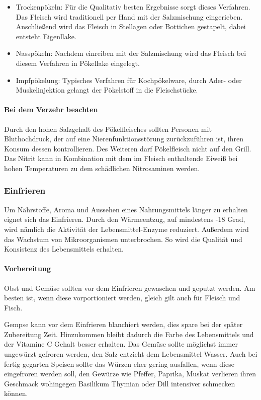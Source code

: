 \begin{itemize}
  \item Trockenpökeln: Für die Qualitativ besten Ergebnisse sorgt dieses Verfahren. Das Fleisch wird traditionell per Hand mit der Salzmischung eingerieben. Anschließend wird das Fleisch in Stellagen oder Bottichen gestapelt, dabei entsteht Eigenllake.
  \item Nasspökeln: Nachdem einreiben mit der Salzmischung wird das Fleisch bei diesem Verfahren in Pökellake eingelegt.
  \item   Impfpökelung: Typisches Verfahren für Kochpökelware, durch Ader- oder Muskelinjektion gelangt der Pökelstoff in die Fleischstücke.
 
\end{itemize}


\paragraph{Bei dem Verzehr beachten}
Durch den hohen Salzgehalt des Pökelfleisches sollten Personen mit Bluthochdruck, der auf eine Nierenfunktionsstörung zurückzuführen ist, ihren Konsum dessen kontrollieren. Des Weiteren darf Pökelfleisch nicht auf den Grill. Das Nitrit kann in Kombination mit dem im Fleisch enthaltende Eiweiß bei hohen Temperaturen zu dem schädlichen Nitrosaminen werden.


\subsubsection{Einfrieren}
Um Nährstoffe, Aroma und Aussehen eines Nahrungsmittels länger zu erhalten eignet sich das Einfrieren. Durch den Wärmeentzug, auf mindestens -18 Grad, wird nämlich die Aktivität der Lebensmittel-Enzyme reduziert. Außerdem wird das Wachstum von Mikroorganismen unterbrochen. So wird die Qualität und Konsistenz des Lebensmittels erhalten. %


\paragraph{Vorbereitung}
Obst und Gemüse sollten vor dem Einfrieren gewaschen und geputzt werden. Am besten ist, wenn diese vorportioniert werden, gleich gilt auch für Fleisch und Fisch. %

Gempse kann vor dem Einfrieren blanchiert werden, dies spare bei der später Zubereitung Zeit. Hinzukommen bleibt dadurch die Farbe des Lebensmittels und der Vitamine C Gehalt besser erhalten. Das Gemüse sollte möglichst immer ungewürzt gefroren werden, den Salz entzieht dem Lebensmittel Wasser. Auch bei fertig gegarten Speisen sollte das Würzen eher gering ausfallen, wenn diese eingefroren werden soll, den Gewürze wie Pfeffer, Paprika, Muskat verlieren ihren Geschmack wohingegen Basilikum Thymian oder Dill intensiver schmecken können. %

